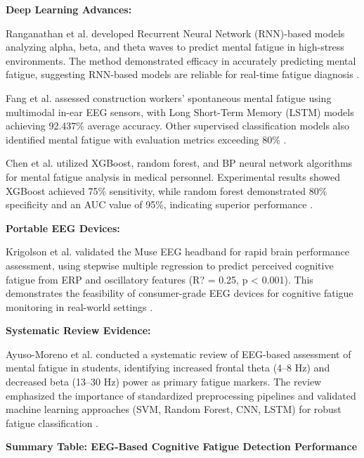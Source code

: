 \documentclass[journal,twoside,10pt]{IEEEtran}
\begin{document}
\textbf{Deep Learning Advances:}

Ranganathan et al. \cite{ref8} developed Recurrent Neural Network (RNN)-based models analyzing alpha, beta, and theta waves to predict mental fatigue in high-stress environments. The method demonstrated efficacy in accurately predicting mental fatigue, suggesting RNN-based models are reliable for real-time fatigue diagnosis \cite{ref8}.

Fang et al. \cite{ref25} assessed construction workers' spontaneous mental fatigue using multimodal in-ear EEG sensors, with Long Short-Term Memory (LSTM) models achieving 92.437\% average accuracy. Other supervised classification models also identified mental fatigue with evaluation metrics exceeding 80\% \cite{ref25}.

Chen et al. \cite{ref26} utilized XGBoost, random forest, and BP neural network algorithms for mental fatigue analysis in medical personnel. Experimental results showed XGBoost achieved 75\% sensitivity, while random forest demonstrated 80\% specificity and an AUC value of 95\%, indicating superior performance \cite{ref26}.

\textbf{Portable EEG Devices:}

Krigolson et al. \cite{ref23} validated the Muse EEG headband for rapid brain performance assessment, using stepwise multiple regression to predict perceived cognitive fatigue from ERP and oscillatory features (R? = 0.25, p < 0.001). This demonstrates the feasibility of consumer-grade EEG devices for cognitive fatigue monitoring in real-world settings \cite{ref23}.

\textbf{Systematic Review Evidence:}

Ayuso-Moreno et al. \cite{ref18} conducted a systematic review of EEG-based assessment of mental fatigue in students, identifying increased frontal theta (4--8 Hz) and decreased beta (13--30 Hz) power as primary fatigue markers. The review emphasized the importance of standardized preprocessing pipelines and validated machine learning approaches (SVM, Random Forest, CNN, LSTM) for robust fatigue classification \cite{ref18}.

\textbf{Summary Table: EEG-Based Cognitive Fatigue Detection Performance}
\end{document}
